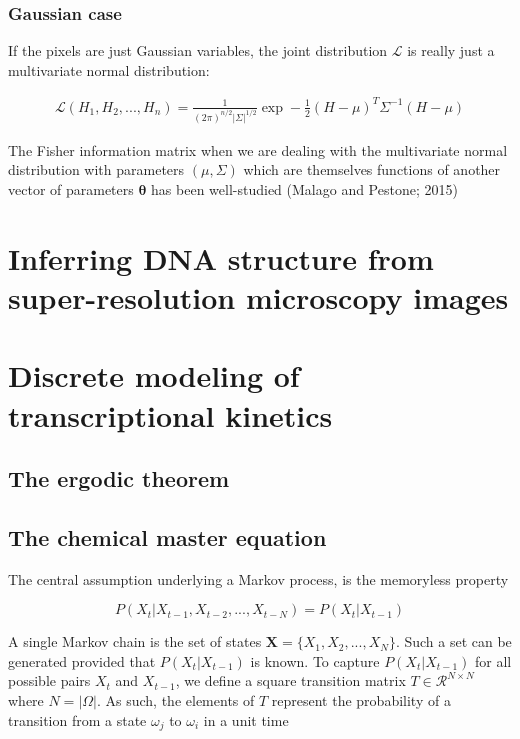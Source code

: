 \documentclass{ucetd}
\begin{document}
\subsection{Gaussian case}
If the pixels are just Gaussian variables, the joint distribution $\mathcal{L}$ is really just a multivariate normal distribution:

\begin{align*}
\mathcal{L}(H_{1},H_{2},...,H_{n}) = \frac{1}{(2\pi)^{n/2}|\Sigma|^{1/2}}\exp-\frac{1}{2}(H-\mu)^{T}\Sigma^{-1}(H-\mu)
\end{align*}

The Fisher information matrix when we are dealing with the multivariate normal distribution with parameters $(\mu,\Sigma)$ which are themselves functions of another vector of parameters $\bm{\theta}$ has been well-studied (Malago and Pestone; 2015)

\chapter{Inferring DNA structure from super-resolution microscopy images}

\chapter{Discrete modeling of transcriptional kinetics}

\section{The ergodic theorem}

\section{The chemical master equation}

The central assumption underlying a Markov process, is the memoryless property

\begin{equation*}
P(X_{t}|X_{t-1}, X_{t-2}, ..., X_{t-N}) = P(X_{t}|X_{t-1})
\end{equation*}

A single Markov chain is the set of states $\bm{X} = \{X_{1},X_{2},...,X_{N}\}$. Such a set can be generated provided that $P(X_{t}|X_{t-1})$ is known. To capture $P(X_{t}|X_{t-1})$ for all possible pairs $X_{t}$ and $X_{t-1}$, we define a square transition matrix $T\in \mathcal{R}^{N\times N}$ where $N = |\Omega|$. As such, the elements of $T$ represent the probability of a transition from a state $\omega_{j}$ to $\omega_{i}$ in a unit time
\end{document}

